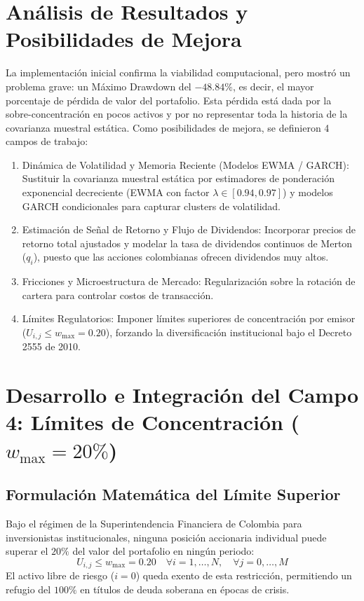 \documentclass[11pt,a4paper]{article}
\begin{document}
\section{Análisis de Resultados y Posibilidades de Mejora}

La implementación inicial confirma la viabilidad computacional, pero mostró un problema grave: un Máximo Drawdown del $-48.84\%$, es decir, el mayor porcentaje de pérdida de valor del portafolio. Esta pérdida está dada por la sobre-concentración en pocos activos y por no representar toda la historia de la covarianza muestral estática. Como posibilidades de mejora, se definieron 4 campos de trabajo:

\begin{enumerate}
    \item Dinámica de Volatilidad y Memoria Reciente (Modelos EWMA / GARCH):
    Sustituir la covarianza muestral estática por estimadores de ponderación exponencial decreciente (EWMA con factor $\lambda \in [0.94, 0.97]$) y modelos GARCH condicionales para capturar clusters de volatilidad.
    \item Estimación de Señal de Retorno y Flujo de Dividendos:
    Incorporar precios de retorno total ajustados y modelar la tasa de dividendos continuos de Merton ($q_i$), puesto que las acciones colombianas ofrecen dividendos muy altos.
    \item Fricciones y Microestructura de Mercado:
    Regularización sobre la rotación de cartera para controlar costos de transacción.
    \item Límites Regulatorios:
    Imponer límites superiores de concentración por emisor ($U_{i,j} \le w_{\max} = 0.20$), forzando la diversificación institucional bajo el Decreto 2555 de 2010.
\end{enumerate}

\section{Desarrollo e Integración del Campo 4: Límites de Concentración \texorpdfstring{($w_{\max} = 20\%$)}{(w\_max = 20\%)}}

\subsection{Formulación Matemática del Límite Superior}
Bajo el régimen de la Superintendencia Financiera de Colombia para inversionistas institucionales, ninguna posición accionaria individual puede superar el $20\%$ del valor del portafolio en ningún periodo:
\begin{equation}
    U_{i,j} \le w_{\max} = 0.20 \quad \forall i = 1, \dots, N, \quad \forall j = 0, \dots, M
\end{equation}
El activo libre de riesgo ($i=0$) queda exento de esta restricción, permitiendo un refugio del $100\%$ en títulos de deuda soberana en épocas de crisis.
\end{document}

